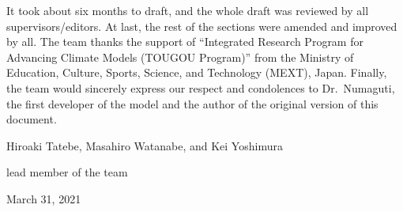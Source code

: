 It took about six months to draft, and the whole draft was reviewed by
all supervisors/editors. At last, the rest of the sections were amended
and improved by all. The team thanks the support of ``Integrated
Research Program for Advancing Climate Models (TOUGOU Program)'' from
the Ministry of Education, Culture, Sports, Science, and Technology
(MEXT), Japan. Finally, the team would sincerely express our respect and
condolences to Dr.~Numaguti, the first developer of the model and the
author of the original version of this document.

Hiroaki Tatebe, Masahiro Watanabe, and Kei Yoshimura

lead member of the team

March 31, 2021
